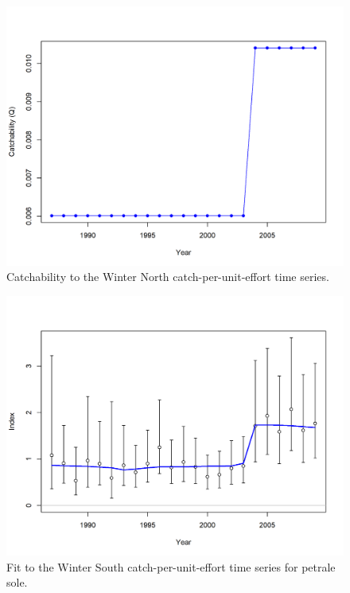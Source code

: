 \documentclass[12pt,]{article}
\begin{document}
\FloatBarrier

\begin{figure}
\centering
\includegraphics{r4ss/plots_mod1/index7_timevaryingQ_Winter (N).png}
\caption{Catchability to the Winter North catch-per-unit-effort time
series. \label{fig:q_north}}
\end{figure}

\FloatBarrier

\begin{figure}
\centering
\includegraphics{r4ss/plots_mod1/index2_cpuefit_Winter (S).png}
\caption{Fit to the Winter South catch-per-unit-effort time series for
petrale sole. \label{fig:fit_ws_cpue}}
\end{figure}
\end{document}
